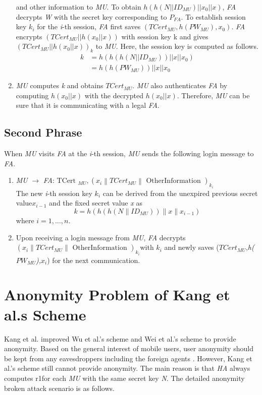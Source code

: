 \documentclass{article}
\begin{document}
\begin{enumerate}
and other information to \emph{MU}. To obtain $h(h(N||ID_{MU})||x_0||x)$, \emph{FA} decrypts \emph{W} 
with the secret key corresponding to $P_{FA}$. To establish session key $k_i$ for the \emph{i}-th session, 
\emph{FA} first saves $(T{Cert}_{MU}, h({PW}_{MU}),x_0)$. \emph{FA} encrypts 
$(T{Cert}_{MU}||h(x_0||x))$ with session key k and gives $(T{Cert}_{MU}||h(x_0||x))_k$ to \emph{MU}. 
Here, the session key is computed as follows.  
   \begin{equation}
    \begin{aligned}
        k & = h(h(h(N||ID_{MU}))||x||x_{0}) \\
          & = h(h(PW_{MU}))||x||x_{0}
    \end{aligned}         
    \end{equation}
    \item \emph{MU} computes \emph{k} and obtains $T{Cert}_{MU}$. \emph{MU} also authenticates 
\emph{FA} by computing $h(x_0||x)$ with the decrypted $h(x_0||x)$. Therefore, \emph{MU} can be sure that it 
is communicating with a legal \emph{FA}.
\end{enumerate}
\subsection{Second Phrase}
\noindent When \emph{MU} visits \emph{FA} at the \emph{i}-th session, \emph{MU} sends the following 
login message to \emph{FA}.
\begin{enumerate}
    \item \emph{MU} $\rightarrow$ \emph{FA}:$\text { TCert }_{M U},\left(x_{i}\left\|T C e r t_{M U}\right\| \text { OtherInformation }\right)_{k_{i}}$\\
    The new \emph{i}-th session key \emph{$k_i$} can be derived from the unexpired previous secret 
value\emph{$x_{i-1}$} and the fixed secret value \emph{x} as%
    \begin{equation}
        k=h\left(h\left(h\left(N \| I D_{M U}\right)\right)\|x\| x_{i-1}\right)
    \end{equation}
    where $i = 1,\ldots,n$.
    \item Upon receiving a login message from \emph{MU}, \emph{FA} decrypts $\left(x_{i}\left\|T C e r t_{M U}\right\| \text { OtherInformation }\right)_{k_{i}}$with $k_{i}$ and newly saves ($TCert_{MU}$,\emph{h($PW_{MU}$),$x_i$}) for the next communication.
\end{enumerate}

\section {Anonymity Problem of Kang et al.s Scheme}
\noindent Kang et al. \cite{ZYan122} improved Wu et al.’s scheme \cite{Lohr10} and Wei et al.’s scheme \cite{Ateniese11} to provide anonymity. 
Based on the general interest of mobile users, user anonymity should be kept from any eavesdroppers including 
the foreign agents \cite{Barsoum11}. However, Kang et al.’s scheme still cannot provide anonymity. The main reason is that 
\emph{HA} always computes r1for each \emph{MU} with the same secret key \emph{N}. The detailed 
anonymity broken attack scenario is as follows.
\end{document}
